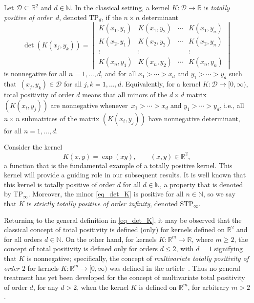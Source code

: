 \documentclass[pdftex]{sigma}
\numberwithin{equation}{section}
\def\N{{\mathbb N}}
\def\R{{\mathbb R}}
\def\mcalD{\mathcal{D}}
\begin{document}
Let $\mcalD \subseteq \R^2$ and $d \in \N$. In the classical setting, a kernel $K\colon \mcalD \to \R$ is {\it totally positive of order}~$d$, denoted TP$_d$, if the $n \times n$ determinant
\begin{equation}
\det(K(x_j,y_k)) =
\begin{vmatrix}
K(x_1,y_1) & K(x_1,y_2) & \cdots & K(x_1,y_n) \\
K(x_2,y_1) & K(x_2,y_2) & \cdots & K(x_2,y_n) \\
\vdots & \vdots & & \vdots \\
K(x_n,y_1) & K(x_n,y_2) & \cdots & K(x_n,y_n)
\end{vmatrix}\label{eq_det_K}
\end{equation}
is nonnegative for all $n=1,\dots,d$, and for all $x_1 > \cdots > x_d$ and $y_1 > \cdots > y_d$ such that~${(x_j,y_k) \in \mcalD}$ for all $j,k=1,\dots,d$. Equivalently, for a kernel $K \colon \mcalD \to [0,\infty)$, total positivity of order $d$ means that all minors of the $d \times d$ matrix $(K(x_i,y_j))$ are nonnegative whenever~${x_1 > \cdots > x_d}$ and $y_1 > \cdots > y_d$, i.e., all $n \times n$ submatrices of the matrix $(K(x_i,y_j))$ have nonnegative determinant, for all $n=1,\dots,d$.

Consider the kernel
\begin{equation}
K(x,y) = \exp(xy), \qquad (x,y) \in \R^2,\label{eq_exp_tp}
\end{equation}
a function that is the fundamental example of a totally positive kernel. This kernel will provide a guiding role in our subsequent results. It is well known that this kernel is totally positive of order $d$ for all $d \in \N$, a property that is denoted by TP$_\infty$. Moreover, the minor \eqref{eq_det_K} is positive for all $n \in \N$, so we say that $K$ is {\it strictly totally positive of order infinity}, denoted STP$_\infty$.

Returning to the general definition in \eqref{eq_det_K}, it may be observed that the classical concept of total positivity is defined (only) for kernels defined on $\R^2$ and for all orders $d \in \N$. On the other hand, for kernels $K \colon \R^m \to \R$, where $m \ge 2$, the concept of total positivity is defined only for orders $d \le 2$, with $d=1$ signifying that $K$ is nonnegative; specifically, the concept of {\it multivariate totally positivity of order $2$} for kernels $K \colon \R^m \to [0,\infty)$ was defined in the article~\cite{karlinrinott80}. Thus no general treatment has yet been developed for the concept of multivariate total positivity of order $d$, for any $d > 2$, when the kernel $K$ is defined on $\R^m$, for arbitrary $m > 2$.
\end{document}
